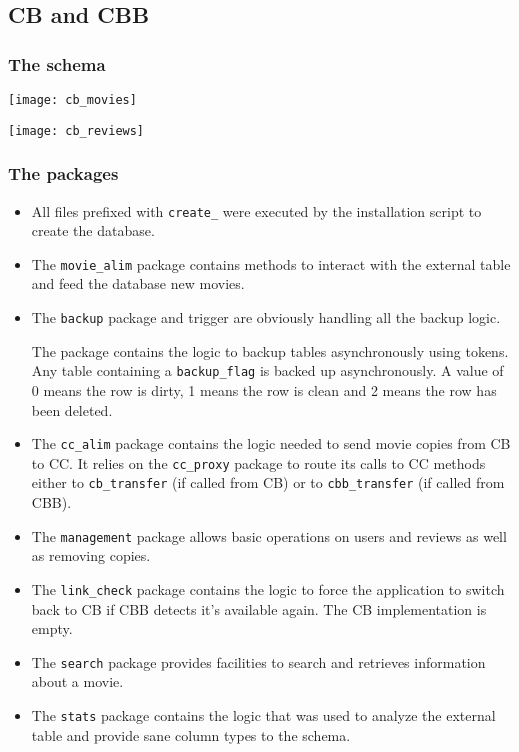 \documentclass[a4paper]{article}
\begin{document}
\subsection{CB and CBB}

\subsubsection{The schema}

\begin{center}
	\texttt{[image: cb\_movies]}
\end{center}

\begin{center}
	\texttt{[image: cb\_reviews]}
\end{center}

\subsubsection{The packages}

\begin{itemize}
	\item All files prefixed with \texttt{create\_} were executed by the installation script to create the database.
	\item The \texttt{movie\_alim} package contains methods to interact with the external table and feed the database new movies.
	\item The \texttt{backup} package and trigger are obviously handling all the backup logic.

	The package contains the logic to backup tables asynchronously using tokens. Any table containing a \texttt{backup\_flag} is backed up asynchronously. A value of 0 means the row is dirty, 1 means the row is clean and 2 means the row has been deleted.
	\item The \texttt{cc\_alim} package contains the logic needed to send movie copies from CB to CC. It relies on the \texttt{cc\_proxy} package to route its calls to CC methods either to \texttt{cb\_transfer} (if called from CB) or to \texttt{cbb\_transfer} (if called from CBB).
	\item The \texttt{management} package allows basic operations on users and reviews as well as removing copies.
	\item The \texttt{link\_check} package contains the logic to force the application to switch back to CB if CBB detects it's available again. The CB implementation is empty.
	\item The \texttt{search} package provides facilities to search and retrieves information about a movie.
	\item The \texttt{stats} package contains the logic that was used to analyze the external table and provide sane column types to the schema.
\end{itemize}
\end{document}
